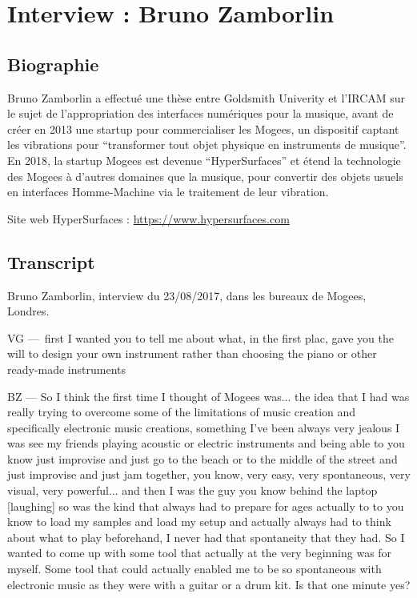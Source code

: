 \chapter{Interview : Bruno Zamborlin}
\label{appendix:zamborlin}

\section*{Biographie}
\noindent Bruno Zamborlin a effectué une thèse entre Goldsmith Univerity et l'IRCAM sur le sujet de l'appropriation des interfaces numériques pour la musique, avant de créer en 2013 une startup pour commercialiser les Mogees, un dispositif captant les vibrations pour ``transformer tout objet physique en instruments de musique''. En 2018, la startup Mogees est devenue ``HyperSurfaces'' et étend la technologie des Mogees à d'autres domaines que la musique, pour convertir des objets usuels en interfaces Homme-Machine via le traitement de leur vibration.

\noindent Site web HyperSurfaces : \url{https://www.hypersurfaces.com}

\section*{Transcript}

\noindent Bruno Zamborlin, interview du 23/08/2017, dans les bureaux de Mogees, Londres.

VG — first I wanted you to tell me about what, in the first plac, gave you the will to design your own instrument rather than choosing the piano or other ready-made instruments 

BZ — So I think the first time I thought of Mogees was... the idea that I had was really trying to overcome some of the limitations of music creation and specifically electronic music creations, something I've been always very jealous I was see my friends playing acoustic or electric instruments and being able to you know just improvise and just go to the beach or to the middle of the street and just improvise and just jam together, you know, very easy, very spontaneous, very visual, very powerful... and then I was the guy you know behind the laptop [laughing] so was the kind that always had to prepare for ages actually to to you know to load my samples and load my setup and actually always had to think about what to play beforehand, I never had that spontaneity that they had. So I wanted to come up with some tool that actually at the very beginning was for myself. Some tool that could actually enabled me to be so spontaneous with electronic music as they were with a guitar or a drum kit. Is that one minute yes? 

